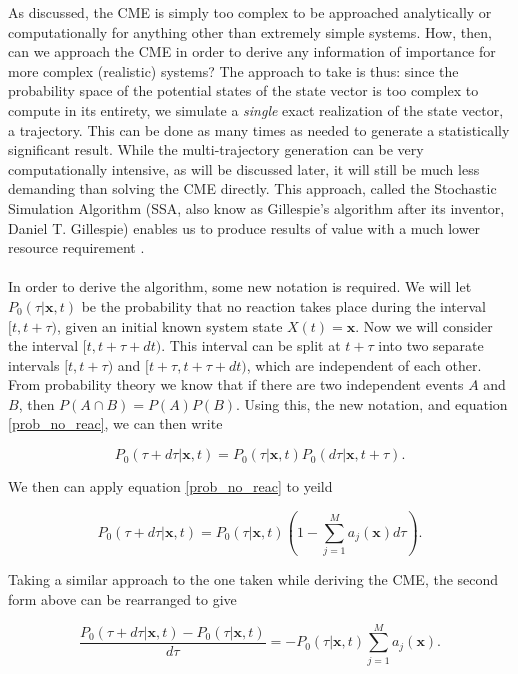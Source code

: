 \documentclass[ugrad,lot,lof,openright,11pt,oneside,onehalfspace]{RUthesis}
\begin{document}
				As discussed, the CME is simply too complex to be approached analytically or computationally for anything other than extremely simple systems. How, then, can we approach the CME in order to derive any information of importance for more complex (realistic) systems? The approach to take is thus: since the probability space of the potential states of the state vector is too complex to compute in its entirety, we simulate a \textit{single} exact realization of the state vector, a trajectory. This can be done as many times as needed to generate a statistically significant result. While the multi-trajectory generation can be very computationally intensive, as will be discussed later, it will still be much less demanding than solving the CME directly. This approach, called the Stochastic Simulation Algorithm (SSA, also know as Gillespie's algorithm after its inventor, Daniel T. Gillespie) enables us to produce results of value with a much lower resource requirement \cite{ssa_intro}.\\
				\\
				In order to derive the algorithm, some new notation is required. We will let $P_0(\tau|\mathbf{x},t)$ be the probability that no reaction takes place during the interval $[t, t+\tau)$, given an initial known system state $X(t) = \mathbf{x}$. Now we will consider the interval $[t, t+\tau+dt)$. This interval can be split at $t+\tau$ into two separate intervals $[t, t+\tau)$ and $[t+\tau, t+\tau+dt)$, which are independent of each other. From probability theory we know that if there are two independent events $A$ and $B$, then $P(A\cap B) = P(A)P(B)$. Using this, the new notation, and equation \eqref{prob_no_reac}, we can then write 

				\begin{equation*}
					P_0(\tau+d\tau|\mathbf{x},t) = P_0(\tau|\mathbf{x},t)P_0(d\tau|\mathbf{x},t+\tau).
				\end{equation*}

				\noindent
				We then can apply equation \eqref{prob_no_reac} to yeild

				\begin{equation*}
					P_0(\tau+d\tau|\mathbf{x},t) = P_0(\tau|\mathbf{x},t)\left( 1 - \sum\limits_{j=1}^M a_j(\mathbf{x})d\tau \right).
				\end{equation*}

				\noindent
				Taking a similar approach to the one taken while deriving the CME, the second form above can be rearranged to give

				\begin{equation*}
				\frac{P_0(\tau+d\tau|\mathbf{x},t) - P_0(\tau|\mathbf{x},t)}{d\tau} = -P_0(\tau|\mathbf{x},t)\sum\limits_{j=1}^M a_j(\mathbf{x}).
				\end{equation*}
\end{document}
